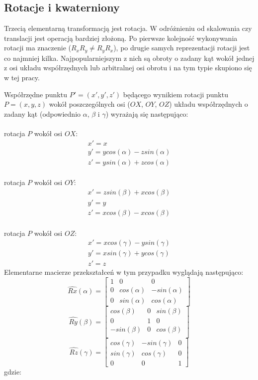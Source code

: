 \documentclass[licencjacka]{pracamgr}
\begin{document}
\subsection{Rotacje i kwaterniony}
Trzecią elementarną transformacją jest rotacja. W odróżnieniu od skalowania czy translacji jest operacją bardziej złożoną. Po pierwsze kolejność wykonywania rotacji ma znaczenie ($R_xR_y\neq R_yR_x$), po drugie samych reprezentacji rotacji jest co najmniej kilka. Najpopularniejszym z nich są obroty o zadany kąt wokół jednej z osi układu współrzędnych lub arbitralnej osi obrotu i na tym typie skupiono się w tej pracy.

Współrzędne punktu $P'=(x',y',z')$ będącego wynikiem rotacji punktu $P=(x,y,z)$ wokół poszczególnych osi ($OX$, $OY$, $OZ$) układu współrzędnych o zadany kąt (odpowiednio $\alpha$, $\beta$ i $\gamma$) wyrażają się następująco:
\\
\\
rotacja $P$ wokół osi $OX$:
$$
\begin{array}{lr}
x'=x \\
y'=ycos(\alpha)-zsin(\alpha) \\
z'=ysin(\alpha)+zcos(\alpha)
\end{array}
$$
\\
rotacja $P$ wokół osi $OY$:
$$
\begin{array}{lr}
x'=zsin(\beta)+xcos(\beta) \\
y'=y \\
z'=xcos(\beta)-xcos(\beta)
\end{array}
$$
\\
rotacja $P$ wokół osi $OZ$:
$$
\begin{array}{lr}
x'=xcos(\gamma)-ysin(\gamma) \\
y'=xsin(\gamma)+ycos(\gamma) \\
z'=z
\end{array}
$$
Elementarne macierze przekształceń w tym przypadku wyglądają następująco:
$$
\hat{Rx}(\alpha)
=
\begin{bmatrix}
1 & 0 & 0 \\
0 & cos(\alpha) & -sin(\alpha) \\
0 & sin(\alpha) & cos(\alpha)
\end{bmatrix}
$$
$$
\hat{Ry}(\beta)
=
\begin{bmatrix}
cos(\beta) & 0 & sin(\beta) \\
0 & 1 & 0 \\
-sin(\beta) & 0 & cos(\beta) \\
\end{bmatrix}
$$
$$
\hat{Rz}(\gamma)
=
\begin{bmatrix}
cos(\gamma) & -sin(\gamma) & 0 \\
sin(\gamma) & cos(\gamma) & 0 \\
0 & 0 & 1
\end{bmatrix}
$$
gdzie:
\end{document}
